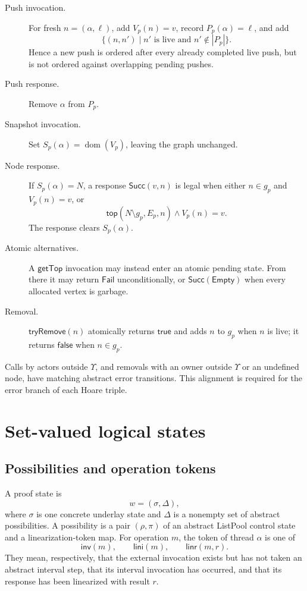 \documentclass[11pt]{article}
\theoremstyle{definition}
\theoremstyle{remark}
\newcommand{\dom}{\mathop{\mathrm{dom}}}
\newcommand{\Inv}{\mathsf{inv}}
\newcommand{\Lini}{\mathsf{lini}}
\newcommand{\Linr}{\mathsf{linr}}
\newcommand{\GetTop}{\mathsf{getTop}}
\newcommand{\TryRemove}{\mathsf{tryRemove}}
\newcommand{\Succ}{\mathsf{Succ}}
\newcommand{\Fail}{\mathsf{Fail}}
\newcommand{\Empty}{\mathsf{Empty}}
\newcommand{\true}{\mathsf{true}}
\newcommand{\false}{\mathsf{false}}
\newcommand{\poss}{\Delta}
\newcommand{\conc}{\sigma}
\newcommand{\abst}{\rho}
\newcommand{\tokens}{\pi}
\begin{document}
\begin{description}
\item[Push invocation.]  For fresh \(n=(\alpha,\ell)\), add
  \(V_p(n)=v\), record \(P_p(\alpha)=\ell\), and add
  \[
    \{(n,n')\mid n'\text{ is live and }n'\notin |P_p|\}.
  \]
  Hence a new push is ordered after every already completed live push, but is
  not ordered against overlapping pending pushes.

\item[Push response.] Remove \(\alpha\) from \(P_p\).

\item[Snapshot invocation.] Set
  \(S_p(\alpha)=\dom(V_p)\), leaving the graph unchanged.

\item[Node response.] If \(S_p(\alpha)=N\), a response
  \(\Succ(v,n)\) is legal when either
  \(n\in g_p\) and \(V_p(n)=v\), or
  \[
    \mathsf{top}(N\setminus g_p,E_p,n)\land V_p(n)=v.
  \]
  The response clears \(S_p(\alpha)\).

\item[Atomic alternatives.] A \(\GetTop\) invocation may instead enter an
  atomic pending state.  From there it may return \(\Fail\) unconditionally,
  or \(\Succ(\Empty)\) when every allocated vertex is garbage.

\item[Removal.] \(\TryRemove(n)\) atomically returns \(\true\) and adds
  \(n\) to \(g_p\) when \(n\) is live; it returns \(\false\) when
  \(n\in g_p\).
\end{description}

Calls by actors outside \(\Upsilon\), and removals with an owner outside
\(\Upsilon\) or an undefined node, have matching abstract error transitions.
This alignment is required for the error branch of each Hoare triple.

\section{Set-valued logical states}

\subsection{Possibilities and operation tokens}

A proof state is
\[
  w=(\conc,\poss),
\]
where \(\conc\) is one concrete underlay state and \(\poss\) is a nonempty set
of abstract possibilities.  A possibility is a pair \((\abst,\tokens)\) of an
abstract ListPool control state and a linearization-token map.  For operation
\(m\), the token of thread \(\alpha\) is one of
\[
  \Inv(m),\qquad \Lini(m),\qquad \Linr(m,r).
\]
They mean, respectively, that the external invocation exists but has not
taken an abstract interval step, that its interval invocation has occurred,
and that its response has been linearized with result \(r\).
\end{document}
